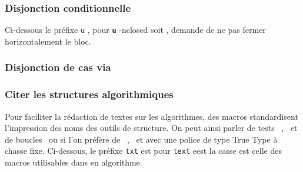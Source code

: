 \documentclass[12pt,a4paper]{article}
\makeatletter
\theoremstyle{definition}
\newcommand\whyprefix[2]{%
    \textbf{\prefix{#1}}-#2%
}
\newcommand\prefix[1]{%
    \texttt{#1}%
}
\newcommand\inenglish{\@ifstar{\@inenglish@star}{\@inenglish@no@star}}
\newcommand\@inenglish@star[1]{%
    \emph{\og #1 \fg}%
}
\newcommand\@inenglish@no@star[1]{%
    \@inenglish@star{#1} en anglais%
}
\makeatother
\begin{document}
\subsubsection{Disjonction conditionnelle \txtIf*}

Ci-dessous le préfixe \prefix{u}, pour \whyprefix{u}{nclosed} soit \inenglish{non fermé}, demande de ne pas fermer horizontalement le bloc.





\subsubsection{Disjonction de cas via \txtSwitch*}



\subsubsection{Citer les structures algorithmiques}

Pour faciliter la rédaction de textes sur les algorithmes, des macros standardisent l'impression des noms des outils de structure. On peut ainsi parler de tests \txtIf\ , \txtIfElseIfElse\ et de boucles \txtWhile\, ou si l'on préfère de \txtIf*\ , \txtIfElseIfElse*\ et \txtWhile*{} avec une police de type True Type à chasse fixe.
Ci-dessous, le préfixe \prefix{txt} est pour \prefix{text} eest la casse est celle des macros utilisables dans en algorithme.


\end{document}
